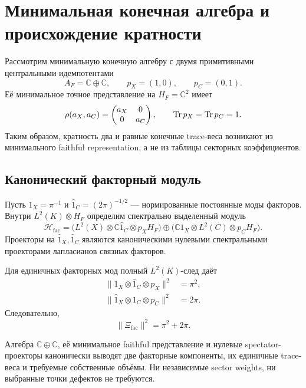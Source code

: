 \chapter{Минимальная конечная алгебра и происхождение кратности}

Рассмотрим минимальную конечную алгебру с двумя примитивными центральными
идемпотентами
\begin{equation}
 A_F=\mathbb C\oplus\mathbb C,
 \qquad
 p_X=(1,0),
 \qquad
 p_C=(0,1).
\end{equation}
Её минимальное точное представление на \(H_F=\mathbb C^2\) имеет
\begin{equation}
 \rho(a_X,a_C)=
 \begin{pmatrix}a_X&0\\0&a_C\end{pmatrix},
 \qquad
 \operatorname{Tr} p_X=\operatorname{Tr} p_C=1.
\end{equation}
Таким образом, кратность два и равные конечные trace-веса возникают из
минимального faithful representation, а не из таблицы секторных
коэффициентов.

\section{Канонический факторный модуль}

Пусть \(\widehat1_X=\pi^{-1}\) и
\(\widehat1_C=(2\pi)^{-1/2}\) --- нормированные постоянные моды факторов.
Внутри \(L^2(K)\otimes H_F\) определим спектрально выделенный модуль
\begin{equation}
 \mathcal H_{\mathrm{fac}}
 =
 \bigl(L^2(X)\otimes\mathbb C\widehat1_C\otimes p_XH_F\bigr)
 \oplus
 \bigl(\mathbb C\widehat1_X\otimes L^2(C)\otimes p_CH_F\bigr).
\end{equation}
Проекторы на \(\widehat1_X,\widehat1_C\) являются каноническими
нулевыми спектральными проекторами лапласианов связных факторов.

Для единичных факторных мод полный \(L^2(K)\)-след даёт
\begin{align}
 \|1_X\otimes\widehat1_C\otimes p_X\|^2
 &=\pi^2,\\
 \|\widehat1_X\otimes1_C\otimes p_C\|^2
 &=2\pi.
\end{align}
Следовательно,
\begin{equation}
 \|\Xi_{\mathrm{fac}}\|^2=\pi^2+2\pi.
\end{equation}

\begin{theorem}
Алгебра \(\mathbb C\oplus\mathbb C\), её минимальное faithful
представление и нулевые spectator-проекторы канонически выводят две
факторные компоненты, их единичные trace-веса и требуемые собственные
объёмы. Ни независимые sector weights, ни выбранные точки дефектов не
требуются.
\end{theorem}


